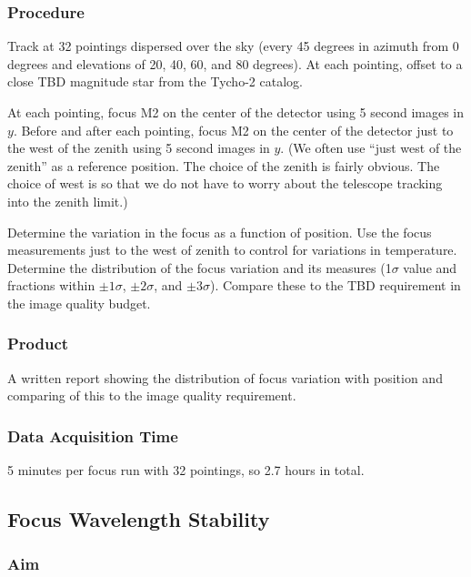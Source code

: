 \documentclass{article}
\begin{document}
\subsubsection{Procedure}

Track at 32 pointings dispersed over the sky (every 45 degrees in azimuth from 0 degrees and elevations of 20, 40, 60, and 80 degrees). At each pointing, offset to a close TBD magnitude star from the Tycho-2 catalog.

At each pointing, focus M2 on the center of the detector using 5 second images in $y$. Before and after each pointing, focus M2 on the center of the detector just to the west of the zenith using 5 second images in $y$. (We often use “just west of the zenith” as a reference position. The choice of the zenith is fairly obvious. The choice of west is so that we do not have to worry about the telescope tracking into the zenith limit.)

Determine the variation in the focus as a function of position. Use the focus measurements just to the west of zenith to control for variations in temperature. Determine the distribution of the focus variation and its measures (1$\sigma$ value and fractions within $\pm1\sigma$, $\pm2\sigma$, and $\pm3\sigma$). Compare these to the TBD requirement in the image quality budget.

\subsubsection{Product}

A written report showing the distribution of focus variation with position and comparing of this to the image quality requirement.

\subsubsection{Data Acquisition Time}

5 minutes per focus run with 32 pointings, so 2.7 hours in total.


\subsection{Focus Wavelength Stability}

\subsubsection{Aim}
\end{document}
